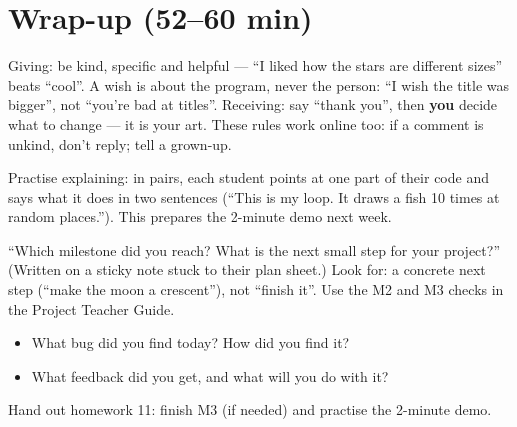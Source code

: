 \section{Wrap-up (52--60 min)}
\begin{safety}
Giving: be kind, specific and helpful --- \enquote{I liked how the stars are different sizes} beats \enquote{cool}. A wish is about the program, never the person: \enquote{I wish the title was bigger}, not \enquote{you're bad at titles}. Receiving: say \enquote{thank you}, then \textbf{you} decide what to change --- it is your art. These rules work online too: if a comment is unkind, don't reply; tell a grown-up.
\end{safety}
Practise explaining: in pairs, each student points at one part of their code and says what it does in two sentences (\enquote{This is my loop. It draws a fish 10 times at random places.}). This prepares the 2-minute demo next week.
\begin{formativecheck}
\enquote{Which milestone did you reach? What is the next small step for your project?} (Written on a sticky note stuck to their plan sheet.) Look for: a concrete next step (\enquote{make the moon a crescent}), not \enquote{finish it}. Use the M2 and M3 checks in the Project Teacher Guide.
\end{formativecheck}
\begin{reflection}
\begin{itemize}[leftmargin=1.2em,itemsep=1pt]
  \item What bug did you find today? How did you find it?
  \item What feedback did you get, and what will you do with it?
\end{itemize}
Hand out homework 11: finish M3 (if needed) and practise the 2-minute demo.
\end{reflection}

